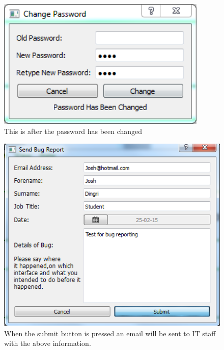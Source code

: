 \begin{figure}[H]
    \includegraphics[width=100mm,scale=1]{./Testing/Images/PassChange1.png}
    \caption{This is after the password has been changed} \label{fig:PassChange}
\end{figure}

\begin{figure}[H]
    \includegraphics[width=\textwidth]{./Testing/Images/SubmitBugTest.png}
    \caption{When the submit button is pressed an email will be sent to IT staff with the above information.} \label{fig:SubmitBugTest}
\end{figure}


